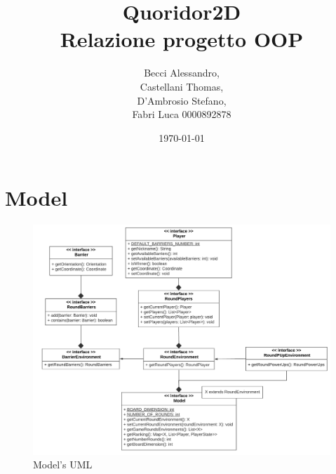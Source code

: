\documentclass[12pt]{article}
\begin{document}
	\title{\Huge \textbf{Quoridor2D} \\ \vspace{0.4cm} \large Relazione progetto OOP}
	\author{Becci Alessandro,\\
	Castellani Thomas, \\
	D'Ambrosio Stefano, \\
	Fabri Luca 0000892878}
	\date{\today}
	\maketitle 
	\newpage
	
	\tableofcontents{}
	\newpage
	

\section{Model}
\begin{figure}[h]
\includegraphics[width = \textwidth , scale = 1.5]{quoridor2D-model}
\centering	
\caption{Model's UML}
\end{figure}
\end{document}
